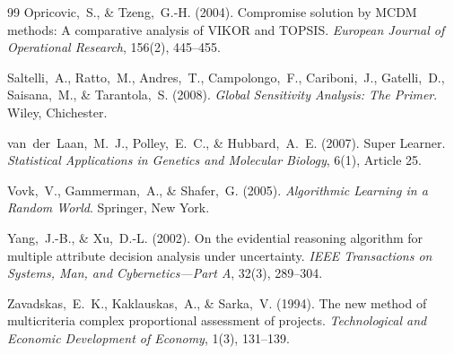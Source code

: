 \documentclass[12pt, a4paper]{article}
\begin{document}
\begin{thebibliography}{99}
Opricovic,~S., \& Tzeng,~G.-H. (2004).
Compromise solution by MCDM methods: A comparative analysis of VIKOR and TOPSIS.
\textit{European Journal of Operational Research}, 156(2), 445--455.

Saltelli,~A., Ratto,~M., Andres,~T., Campolongo,~F., Cariboni,~J., Gatelli,~D., Saisana,~M., \& Tarantola,~S. (2008).
\textit{Global Sensitivity Analysis: The Primer}.
Wiley, Chichester.

van~der~Laan,~M.~J., Polley,~E.~C., \& Hubbard,~A.~E. (2007).
Super Learner.
\textit{Statistical Applications in Genetics and Molecular Biology}, 6(1), Article 25.

Vovk,~V., Gammerman,~A., \& Shafer,~G. (2005).
\textit{Algorithmic Learning in a Random World}.
Springer, New York.

Yang,~J.-B., \& Xu,~D.-L. (2002).
On the evidential reasoning algorithm for multiple attribute decision analysis under uncertainty.
\textit{IEEE Transactions on Systems, Man, and Cybernetics---Part A}, 32(3), 289--304.

Zavadskas,~E.~K., Kaklauskas,~A., \& Sarka,~V. (1994).
The new method of multicriteria complex proportional assessment of projects.
\textit{Technological and Economic Development of Economy}, 1(3), 131--139.

\end{thebibliography}
\end{document}
